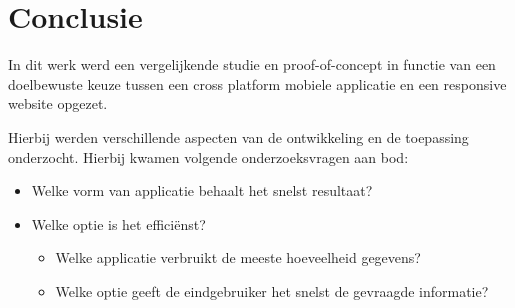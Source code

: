 
\chapter{Conclusie}
\label{ch:conclusie}








In dit werk werd een vergelijkende studie en proof-of-concept in functie van een doelbewuste keuze tussen een
cross platform mobiele applicatie en een responsive website opgezet.

Hierbij werden verschillende aspecten van de ontwikkeling
en de toepassing onderzocht. Hierbij kwamen volgende onderzoeksvragen aan bod:

\begin{itemize}
  \item{Welke vorm van applicatie behaalt het snelst resultaat?}
  \item{Welke optie is het efficiënst?}
  \begin{itemize}
    \item{Welke applicatie verbruikt de meeste hoeveelheid gegevens?}
    \item{Welke optie geeft de eindgebruiker het snelst de gevraagde informatie?}
  \end{itemize}
\end{itemize}

